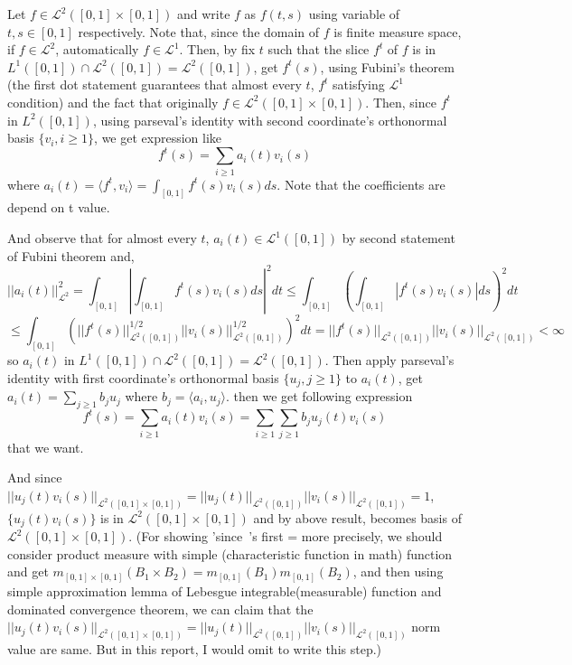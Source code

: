 \documentclass{article}
\begin{document}
Let $f\in \mathcal{L}^2([0,1]\times[0,1])$ and write $f$ as $f(t,s)$ using variable of $t,s\in[0,1]$ respectively.
Note that, since the domain of $f$ is finite measure space, if $f\in\mathcal{L}^2$, automatically $f\in\mathcal{L}^1$.
Then, by fix $t$ such that the slice $f^t$ of $f$ is in $L^1([0,1]) \cap \mathcal{L}^2([0,1])=\mathcal{L}^2([0,1])$, get $f^t(s)$,
using Fubini's theorem (the first dot statement guarantees that almost every $t$, $f^t$ satisfying $\mathcal{L}^1$ condition) and
the fact that originally $f\in \mathcal{L}^2([0,1]\times[0,1])$.
Then, since $f^t$ in $L^2([0,1])$, using parseval's identity with second coordinate's orthonormal basis $\{v_i, i\geq 1\}$,
we get expression like 
\[f^t(s)=\sum_{i\geq 1}a_i(t)v_i(s)\]
where \(a_i(t)=\langle f^t, v_i \rangle=\int_{[0,1]}f^t(s)v_i(s)ds\).
Note that the coefficients are depend on t value.

And observe that for almost every $t$, $a_i(t)\in\mathcal{L}^1([0,1])$ by second statement of Fubini theorem and,
\[||a_i(t)||^2_{\mathcal{L}^2}=\int_{[0,1]}|\int_{[0,1]}f^t(s)v_i(s)ds|^2dt
\leq \int_{[0,1]}(\int_{[0,1]}|f^t(s)v_i(s)|ds)^2dt\]
\[\leq \int_{[0,1]}(||f^t(s)||_{\mathcal{L}^2([0,1])}^{1/2}||v_i(s)||_{\mathcal{L}^2([0,1])}^{1/2})^2dt
=||f^t(s)||_{\mathcal{L}^2([0,1])}||v_i(s)||_{\mathcal{L}^2([0,1])}
< \infty\]
so $a_i(t)$ in $L^1([0,1]) \cap \mathcal{L}^2([0,1])=\mathcal{L}^2([0,1])$.
Then apply parseval's identity with first coordinate's orthonormal basis $\{u_j, j\geq 1\}$ to $a_i(t)$,
get $a_i(t)=\sum_{j \geq 1} b_ju_j$ where $b_j=\langle a_i, u_j\rangle$.
then we get following expression
\[f^t(s)=\sum_{i\geq 1}a_i(t)v_i(s)=\sum_{i\geq 1}\sum_{j \geq 1} b_ju_j(t)v_i(s)\]
that we want.

And since $||u_j(t)v_i(s)||_{\mathcal{L}^2([0,1]\times[0,1])}=||u_j(t)||_{\mathcal{L}^2([0,1])}||v_i(s)||_{\mathcal{L}^2([0,1])}=1$,
$\{u_j(t)v_i(s)\}$ is in $\mathcal{L}^2([0,1]\times[0,1])$ and by above result, becomes basis of $\mathcal{L}^2([0,1]\times[0,1])$.
(For showing 'since~'s first = more precisely, we should consider product measure with simple (characteristic function in math) function and 
get $m_{[0,1]\times[0,1]}(B_1\times B_2)=m_{[0,1]}(B_1)m_{[0,1]}(B_2)$, 
and then using simple approximation lemma of Lebesgue integrable(measurable) function and dominated convergence theorem,
we can claim that the $||u_j(t)v_i(s)||_{\mathcal{L}^2([0,1]\times[0,1])}=||u_j(t)||_{\mathcal{L}^2([0,1])}||v_i(s)||_{\mathcal{L}^2([0,1])}$ norm value are same.
But in this report, I would omit to write this step.)
\end{document}
